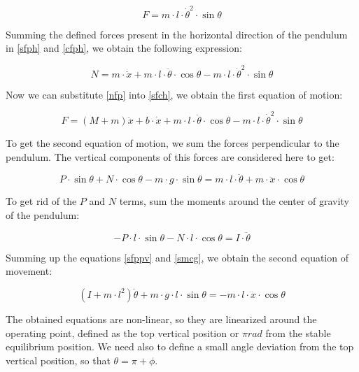 \begin{equation} \label{cfph}
	F=m\cdot l\cdot \dot{\theta}^2\cdot \sin{\theta}
\end{equation}

Summing the defined forces present in the horizontal direction of the pendulum in \ref{sfph} and \ref{cfph}, we obtain the following expression:

\begin{equation} \label{nfp}
	N=m\cdot \ddot{x}+m\cdot l\cdot \ddot{\theta}\cdot \cos{\theta}-m\cdot l\cdot \dot{\theta}^2\cdot \sin{\theta}
\end{equation}

Now we can substitute \ref{nfp} into \ref{sfch}, we obtain the first equation of motion:

\begin{equation} \label{fem}
	F=(M+m)\ddot{x}+b\cdot \dot{x}+m\cdot l\cdot \ddot{\theta}\cdot \cos{\theta}-m\cdot l\cdot \dot{\theta}^2\cdot \sin{\theta}
\end{equation}

To get the second equation of motion, we sum the forces perpendicular to the pendulum. The vertical components of this forces are considered here to get:

\begin{equation} \label{sfppv}
	P\cdot \sin{\theta}+N\cdot \cos{\theta}-m\cdot g\cdot \sin{\theta}=m\cdot l\cdot \ddot{\theta}+m\cdot \ddot{x}\cdot \cos{\theta}
\end{equation}

To get rid of the $P$ and $N$ terms, sum the moments around the center of gravity of the pendulum:

\begin{equation} \label{smcg}
	-P\cdot l\cdot \sin{\theta}-N\cdot l\cdot \cos{\theta}=I\cdot \ddot{\theta}
\end{equation}

Summing up the equations \ref{sfppv} and \ref{smcg}, we obtain the second equation of movement:

\begin{equation} \label{sem}
	(I+m\cdot l^2)\ddot{\theta}+m\cdot g\cdot l\cdot \sin{\theta}=-m\cdot l\cdot \ddot{x}\cdot \cos{\theta}
\end{equation}

The obtained equations are non-linear, so they are linearized around the operating point, defined as the top vertical position or $\pi rad$ from the stable equilibrium position. We need also to define a small angle deviation from the top vertical position, so that $\theta=\pi+\phi$.

